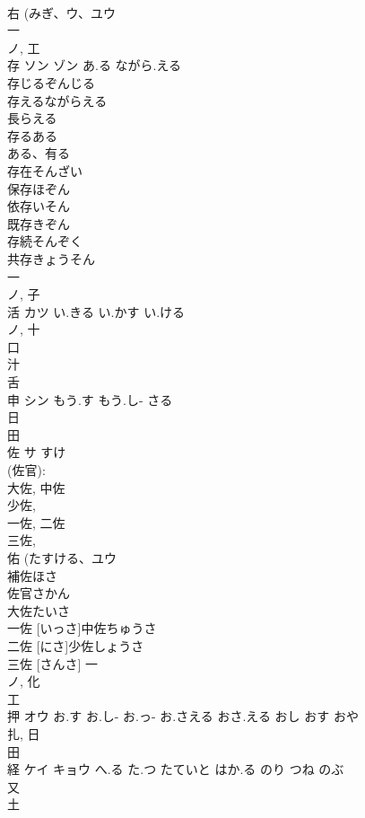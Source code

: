\documentclass[8pt]{extreport}
\begin{document}
\begin{CJK}{UTF8}{min}
\\	右 (みぎ、ウ、ユウ 
\\	一 
\\	ノ, 工 
\\	存	ソン ゾン	あ.る ながら.える	
\\	存じるぞんじる 
\\	存えるながらえる 
\\	長らえる 
\\	存るある 
\\	ある、有る 
\\	存在そんざい 
\\	保存ほぞん 
\\	依存いそん 
\\	既存きぞん 
\\	存続そんぞく 
\\	共存きょうそん 
\\	一 
\\	ノ, 子 
\\	活	カツ	い.きる い.かす い.ける	
\\	ノ, 十 
\\	口 
\\	汁 
\\	舌 
\\	申	シン	もう.す もう.し- さる	
\\	日 
\\	田 
\\	佐	サ	すけ	
\\	(佐官): 
\\	大佐, 中佐 
\\	少佐, 
\\	一佐, 二佐 
\\	三佐, 
\\	佑 (たすける、ユウ 
\\	補佐ほさ
\\	佐官さかん
\\	大佐たいさ
\\	一佐 [いっさ]中佐ちゅうさ
\\	二佐 [にさ]少佐しょうさ
\\	三佐 [さんさ]	一 
\\	ノ, 化 
\\	工 
\\	押	オウ	お.す お.し- お.っ- お.さえる おさ.える おし おす おや	
\\	扎, 日 
\\	田 
\\	経	ケイ キョウ	へ.る た.つ たていと はか.る のり つね のぶ	
\\	又 
\\	土 

\end{CJK}
\end{document}
